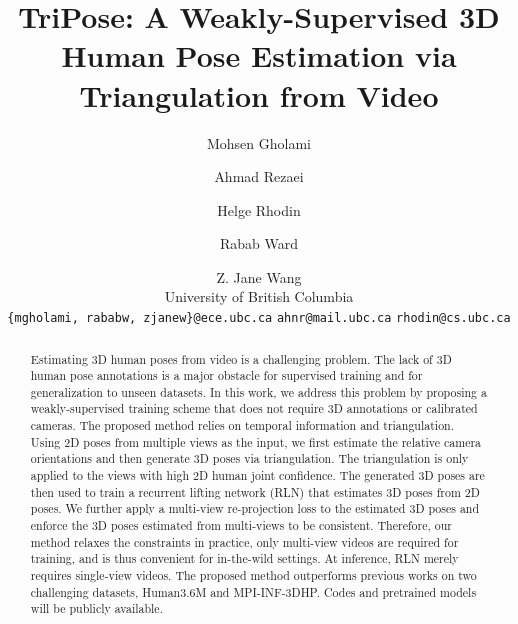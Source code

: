 \documentclass[10pt,twocolumn,letterpaper]{article}
\begin{document}
\title{TriPose: A Weakly-Supervised 3D Human Pose Estimation via Triangulation from Video}


\author{Mohsen Gholami \and Ahmad Rezaei \and Helge Rhodin \and Rabab Ward \and  Z. Jane Wang \\
University of British Columbia\\
{\tt\small \{mgholami, rababw, zjanew\}@ece.ubc.ca}  {  \tt\small ahnr@mail.ubc.ca}  {\tt\small    rhodin@cs.ubc.ca}}



\maketitle
\ificcvfinal\thispagestyle{empty}\fi

\begin{abstract}
Estimating 3D human poses from video is a challenging problem. The lack of 3D human pose annotations is a major obstacle for supervised training and for generalization to unseen datasets. In this work, we address this problem by proposing a weakly-supervised training scheme that does not require 3D annotations or calibrated cameras. The proposed method relies on temporal information and triangulation. Using 2D poses from multiple views as the input, we first estimate the relative camera orientations and then generate 3D poses via triangulation. The triangulation is only applied to the views with high 2D human joint confidence. The generated 3D poses are then used to train a recurrent lifting network (RLN) that estimates 3D poses from 2D poses. We further apply a multi-view re-projection loss to the estimated 3D poses and enforce the 3D poses estimated from multi-views to be consistent. Therefore, our method relaxes the constraints in practice, only multi-view videos are required for training, and  is thus  convenient for in-the-wild settings. At inference, RLN merely requires single-view videos. The proposed method outperforms previous works on two challenging datasets, Human3.6M and MPI-INF-3DHP. Codes and pretrained models will be publicly available.

\end{abstract}
\end{document}
